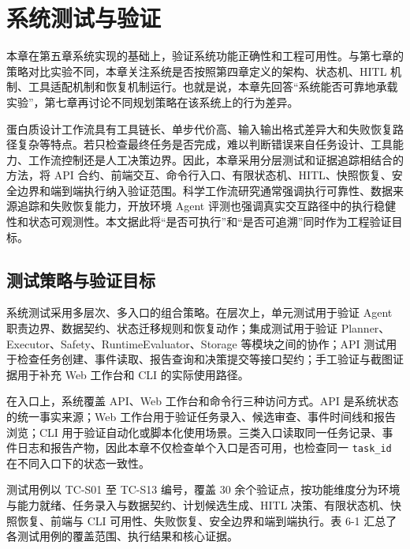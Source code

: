 \section{系统测试与验证}\label{ux7cfbux7edfux6d4bux8bd5ux4e0eux9a8cux8bc1}

本章在第五章系统实现的基础上，验证系统功能正确性和工程可用性。与第七章的策略对比实验不同，本章关注系统是否按照第四章定义的架构、状态机、HITL
机制、工具适配机制和恢复机制运行。也就是说，本章先回答``系统能否可靠地承载实验''，第七章再讨论不同规划策略在该系统上的行为差异。

蛋白质设计工作流具有工具链长、单步代价高、输入输出格式差异大和失败恢复路径复杂等特点。若只检查最终任务是否完成，难以判断错误来自任务设计、工具能力、工作流控制还是人工决策边界。因此，本章采用分层测试和证据追踪相结合的方法，将
API
合约、前端交互、命令行入口、有限状态机、HITL、快照恢复、安全边界和端到端执行纳入验证范围。科学工作流研究通常强调执行可靠性、数据来源追踪和失败恢复能力\citep{simmhan2009reliable}，开放环境
Agent
评测也强调真实交互路径中的执行稳健性和状态可观测性\citep{xie2024osworld}。本文据此将``是否可执行''和``是否可追溯''同时作为工程验证目标。

\subsection{测试策略与验证目标}\label{ux6d4bux8bd5ux7b56ux7565ux4e0eux9a8cux8bc1ux76eeux6807}

系统测试采用多层次、多入口的组合策略。在层次上，单元测试用于验证 Agent
职责边界、数据契约、状态迁移规则和恢复动作；集成测试用于验证
Planner、Executor、Safety、RuntimeEvaluator、Storage
等模块之间的协作；API
测试用于检查任务创建、事件读取、报告查询和决策提交等接口契约；手工验证与截图证据用于补充
Web 工作台和 CLI 的实际使用路径。

在入口上，系统覆盖 API、Web 工作台和命令行三种访问方式。API
是系统状态的统一事实来源；Web
工作台用于验证任务录入、候选审查、事件时间线和报告浏览；CLI
用于验证自动化或脚本化使用场景。三类入口读取同一任务记录、事件日志和报告产物，因此本章不仅检查单个入口是否可用，也检查同一
\texttt{task\_id} 在不同入口下的状态一致性。

测试用例以 TC-S01 至 TC-S13 编号，覆盖 30
余个验证点，按功能维度分为环境与能力就绪、任务录入与数据契约、计划候选生成、HITL
决策、有限状态机、快照恢复、前端与 CLI
可用性、失败恢复、安全边界和端到端执行。表 6-1
汇总了各测试用例的覆盖范围、执行结果和核心证据。

